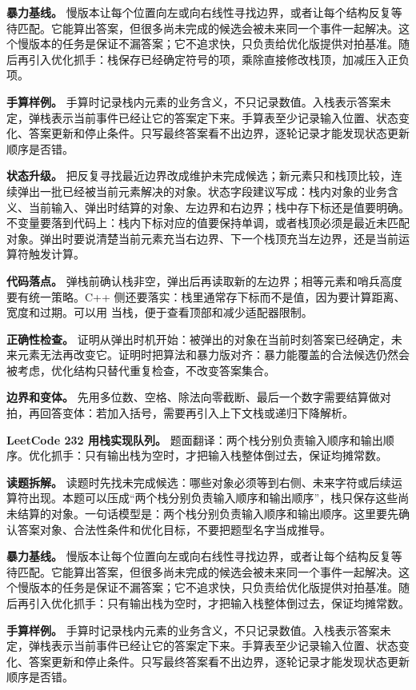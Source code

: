 \textbf{暴力基线。} 慢版本让每个位置向左或向右线性寻找边界，或者让每个结构反复等待匹配。它能算出答案，但很多尚未完成的候选会被未来同一个事件一起解决。这个慢版本的任务是保证不漏答案；它不追求快，只负责给优化版提供对拍基准。随后再引入优化抓手：栈保存已经确定符号的项，乘除直接修改栈顶，加减压入正负项。

\textbf{手算样例。} 手算时记录栈内元素的业务含义，不只记录数值。入栈表示答案未定，弹栈表示当前事件已经让它的答案定下来。手算表至少记录输入位置、状态变化、答案更新和停止条件。只写最终答案看不出边界，逐轮记录才能发现状态更新顺序是否错。

\textbf{状态升级。} 把反复寻找最近边界改成维护未完成候选；新元素只和栈顶比较，连续弹出一批已经被当前元素解决的对象。状态字段建议写成：栈内对象的业务含义、当前输入、弹出时结算的对象、左边界和右边界；栈中存下标还是值要明确。不变量要落到代码上：栈内下标对应的值要保持单调，或者栈顶必须是最近未匹配对象。弹出时要说清楚当前元素充当右边界、下一个栈顶充当左边界，还是当前运算符触发计算。

\textbf{代码落点。} 弹栈前确认栈非空，弹出后再读取新的左边界；相等元素和哨兵高度要有统一策略。C++ 侧还要落实：栈里通常存下标而不是值，因为要计算距离、宽度和过期。可以用  当栈，便于查看顶部和减少适配器限制。

\textbf{正确性检查。} 证明从弹出时机开始：被弹出的对象在当前时刻答案已经确定，未来元素无法再改变它。证明时把算法和暴力版对齐：暴力能覆盖的合法候选仍然会被考虑，优化结构只替代重复检查，不改变答案集合。

\textbf{边界和变体。} 先用多位数、空格、除法向零截断、最后一个数字需要结算做对拍，再回答变体：若加入括号，需要再引入上下文栈或递归下降解析。

\noindent\textbf{LeetCode 232 用栈实现队列。} 题面翻译：两个栈分别负责输入顺序和输出顺序。优化抓手：只有输出栈为空时，才把输入栈整体倒过去，保证均摊常数。

\textbf{读题拆解。} 读题时先找未完成候选：哪些对象必须等到右侧、未来字符或后续运算符出现。本题可以压成“两个栈分别负责输入顺序和输出顺序”，栈只保存这些尚未结算的对象。一句话模型是：两个栈分别负责输入顺序和输出顺序。这里要先确认答案对象、合法性条件和优化目标，不要把题型名字当成推导。

\textbf{暴力基线。} 慢版本让每个位置向左或向右线性寻找边界，或者让每个结构反复等待匹配。它能算出答案，但很多尚未完成的候选会被未来同一个事件一起解决。这个慢版本的任务是保证不漏答案；它不追求快，只负责给优化版提供对拍基准。随后再引入优化抓手：只有输出栈为空时，才把输入栈整体倒过去，保证均摊常数。

\textbf{手算样例。} 手算时记录栈内元素的业务含义，不只记录数值。入栈表示答案未定，弹栈表示当前事件已经让它的答案定下来。手算表至少记录输入位置、状态变化、答案更新和停止条件。只写最终答案看不出边界，逐轮记录才能发现状态更新顺序是否错。

